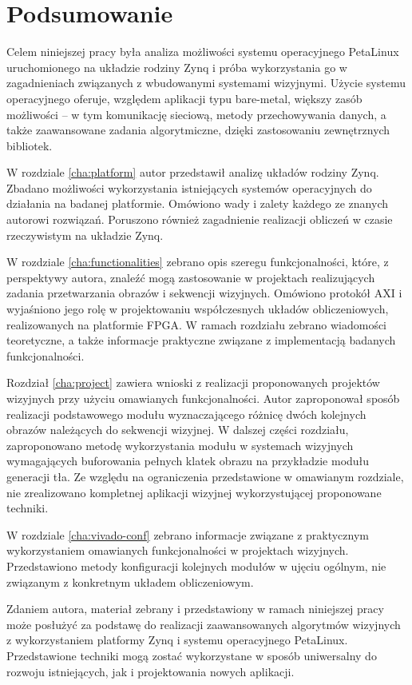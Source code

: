 \chapter{Podsumowanie}
\label{chap:summary}

Celem niniejszej pracy była analiza możliwości systemu operacyjnego PetaLinux uruchomionego na układzie rodziny Zynq i próba wykorzystania go w zagadnieniach związanych z wbudowanymi systemami wizyjnymi. Użycie systemu operacyjnego oferuje, względem aplikacji typu bare-metal, większy zasób możliwości -- w tym komunikację sieciową, metody przechowywania danych, a także zaawansowane zadania algorytmiczne, dzięki zastosowaniu zewnętrznych bibliotek.

W rozdziale \ref{cha:platform} autor przedstawił analizę układów rodziny Zynq. Zbadano możliwości wykorzystania istniejących systemów operacyjnych do działania na badanej platformie. Omówiono wady i zalety każdego ze znanych autorowi rozwiązań. Poruszono również zagadnienie realizacji obliczeń w czasie rzeczywistym na układzie Zynq.

W rozdziale \ref{cha:functionalities} zebrano opis szeregu funkcjonalności, które, z perspektywy autora, znaleźć mogą zastosowanie w projektach realizujących zadania przetwarzania obrazów i sekwencji wizyjnych. Omówiono protokół AXI i wyjaśniono jego rolę w projektowaniu współczesnych układów obliczeniowych, realizowanych na platformie FPGA. W ramach rozdziału zebrano wiadomości teoretyczne, a także informacje praktyczne związane z implementacją badanych funkcjonalności.

Rozdział \ref{cha:project} zawiera wnioski z realizacji proponowanych projektów wizyjnych przy użyciu omawianych funkcjonalności. Autor zaproponował sposób realizacji podstawowego modułu wyznaczającego różnicę dwóch kolejnych obrazów należących do sekwencji wizyjnej. W dalszej części rozdziału, zaproponowano  metodę wykorzystania modułu w systemach wizyjnych wymagających buforowania pełnych klatek obrazu na przykładzie modułu generacji tła. Ze względu na ograniczenia przedstawione w omawianym rozdziale, nie zrealizowano kompletnej aplikacji wizyjnej wykorzystującej proponowane techniki.

W rozdziale \ref{cha:vivado-conf} zebrano informacje związane z praktycznym wykorzystaniem omawianych funkcjonalności w projektach wizyjnych. Przedstawiono metody konfiguracji kolejnych modułów w ujęciu ogólnym, nie związanym z konkretnym układem obliczeniowym.

Zdaniem autora, materiał zebrany i przedstawiony w ramach niniejszej pracy może posłużyć za podstawę do realizacji zaawansowanych algorytmów wizyjnych z wykorzystaniem platformy Zynq i systemu operacyjnego PetaLinux. Przedstawione techniki mogą zostać wykorzystane w sposób uniwersalny do rozwoju istniejących, jak i projektowania nowych aplikacji.

